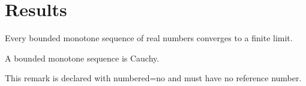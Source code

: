 \documentclass{article}
\begin{document}
\section{Results}

\begin{theorem}\label{thm:t1}
Every bounded monotone sequence of real numbers converges to a finite limit.
\end{theorem}

\begin{corollary}\label{cor:c1}
A bounded monotone sequence is Cauchy.
\end{corollary}

\begin{remark}
This remark is declared with numbered=no and must have no reference number.
\end{remark}
\end{document}
